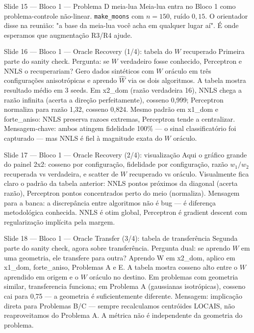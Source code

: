 \documentclass[aspectratio=169,10pt]{beamer}
\begin{document}
\begin{frame}{Slide 15 --- Bloco 1 --- Problema D meia-lua}
\footnotesize
Meia-lua entra no Bloco 1 como problema-controle n\~ao-linear. \texttt{make\_moons} com $n=150$, ru\'ido $0{,}15$. O orientador disse na reuni\~ao: "a base da meia-lua voc\^e acha em qualquer lugar a\'i". \'E onde esperamos que augmenta\c{c}\~ao R3/R4 ajude.
\end{frame}

\begin{frame}{Slide 16 --- Bloco 1 --- Oracle Recovery (1/4): tabela do $W$ recuperado}
\footnotesize
Primeira parte do sanity check. Pergunta: se $W$ verdadeiro fosse conhecido, Perceptron e NNLS o recuperariam? Gero dados sint\'eticos com $W$ or\'aculo em tr\^es configura\c{c}\~oes anisotr\'opicas e aprendo $\hat W$ via os dois algoritmos. A tabela mostra resultado m\'edio em 3 seeds. Em x2\_dom (raz\~ao verdadeira 16), NNLS chega a raz\~ao infinita (acerta a dire\c{c}\~ao perfeitamente), cosseno 0,999; Perceptron normaliza para raz\~ao 1,32, cosseno 0,824. Mesmo padr\~ao em x1\_dom e forte\_aniso: NNLS preserva razoes extremas, Perceptron tende a centralizar. Mensagem-chave: ambos atingem fidelidade 100\% --- o sinal classificat\'orio foi capturado --- mas NNLS \'e fiel \`a magnitude exata do $W$ or\'aculo.
\end{frame}

\begin{frame}{Slide 17 --- Bloco 1 --- Oracle Recovery (2/4): visualiza\c{c}\~ao}
\footnotesize
Aqui o gr\'afico grande do painel 2x2: cosseno por configura\c{c}\~ao, fidelidade por configura\c{c}\~ao, raz\~ao $w_1/w_2$ recuperada vs verdadeira, e scatter de $W$ recuperado vs or\'aculo. Visualmente fica claro o padr\~ao da tabela anterior: NNLS pontos pr\'oximos da diagonal (acerta raz\~ao), Perceptron pontos concentrados perto do meio (normaliza). Mensagem para a banca: a discrep\^ancia entre algoritmos n\~ao \'e bug --- \'e diferen\c{c}a metodol\'ogica conhecida. NNLS \'e otim global, Perceptron \'e gradient descent com regulariza\c{c}\~ao impl\'icita pela margem.
\end{frame}

\begin{frame}{Slide 18 --- Bloco 1 --- Oracle Transfer (3/4): tabela de transfer\^encia}
\footnotesize
Segunda parte do sanity check, agora sobre transfer\^encia. Pergunta dual: se aprendo $W$ em uma geometria, ele transfere para outra? Aprendo W em x2\_dom, aplico em x1\_dom, forte\_aniso, Problemas A e E. A tabela mostra cosseno alto entre o $W$ aprendido em origem e o $W$ or\'aculo no destino. Em problemas com geometria similar, transferencia funciona; em Problema A (gaussianas isotr\'opicas), cosseno cai para 0,75 --- a geometria \'e suficientemente diferente. Mensagem: implica\c{c}\~ao direta para Problemas B/C --- sempre recalculamos centr\'oides LOCAIS, n\~ao reaproveitamos do Problema A. A m\'etrica n\~ao \'e independente da geometria do problema.
\end{frame}
\end{document}
